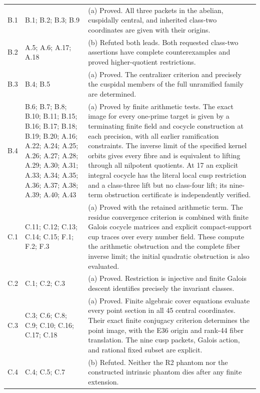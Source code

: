 \begin{longtable}{@{}p{1.1cm}p{3.0cm}p{10.3cm}@{}}
B.1 & B.1; B.2; B.3; B.9 & (a) Proved. All three packets in the abelian, cuspidally central, and inherited class-two coordinates are given with their origins. \\
B.2 & A.5; A.6; A.17; A.18 & (b) Refuted both leads. Both requested class-two assertions have complete counterexamples and proved higher-quotient restrictions. \\
B.3 & B.4; B.5 & (a) Proved. The centralizer criterion and precisely the cuspidal members of the full unramified family are determined. \\
B.4 & B.6; B.7; B.8; B.10; B.11; B.15; B.16; B.17; B.18; B.19; B.20; A.16; A.22; A.24; A.25; A.26; A.27; A.28; A.29; A.30; A.31; A.33; A.34; A.35; A.36; A.37; A.38; A.39; A.40; A.43 & (a) Proved by finite arithmetic tests. The exact image for every one-prime target is given by a terminating finite field and cocycle construction at each precision, with all earlier ramification constraints. The inverse limit of the specified kernel orbits gives every fibre and is equivalent to lifting through all nilpotent quotients. At 17 an explicit integral cocycle has the literal local cusp restriction and a class-three lift but no class-four lift; its nine-term obstruction certificate is independently verified. \\
C.1 & C.11; C.12; C.13; C.14; C.15; F.1; F.2; F.3 & (a) Proved with the retained arithmetic term. The residue convergence criterion is combined with finite Galois cocycle matrices and explicit compact-support cup traces over every number field. These compute the arithmetic obstruction and the complete fiber inverse limit; the initial quadratic obstruction is also evaluated. \\
C.2 & C.1; C.2; C.3 & (a) Proved. Restriction is injective and finite Galois descent identifies precisely the invariant classes. \\
C.3 & C.3; C.6; C.8; C.9; C.10; C.16; C.17; C.18 & (a) Proved. Finite algebraic cover equations evaluate every point section in all 45 central coordinates. Their exact finite conjugacy criterion determines the point image, with the E36 origin and rank-44 fiber translation. The nine cusp packets, Galois action, and rational fixed subset are explicit. \\
C.4 & C.4; C.5; C.7 & (b) Refuted. Neither the R2 phantom nor the constructed intrinsic phantom dies after any finite extension. \\

\end{longtable}
